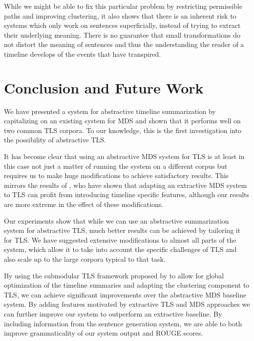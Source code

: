 \documentclass[a4paper,BCOR=10mm]{report}
\numberwithin{lemma}{chapter}
\numberwithin{definition}{chapter}
\begin{document}
While we might be able to fix this particular problem by restricting permissible paths and improving clustering, it also shows that there is an inherent risk to systems which only work on sentences superficially, instead of trying to extract their underlying meaning.
There is no guarantee that small transformations do not distort the meaning of sentences and thus the understanding the reader of a timeline develops of the events that have transpired.



\chapter{Conclusion and Future Work}  \label{sec:conclusion}


We have presented a system for abstractive timeline summarization by capitalizing on an existing system for MDS and shown that it performs well on two common TLS corpora. To our knowledge, this is the first investigation into the possibility of abstractive TLS.

It has become clear that using an abstractive MDS system for TLS is at least in this case not just a matter of running the system on a different corpus but requires us to make huge modifications to achieve satisfactory results. This mirrors the results of \citet{markert}, who have shown that adapting an extractive MDS system to TLS can profit from introducing timeline specific features, although our results are more extreme in the effect of these modifications.

Our experiments show that while we can use an abstractive summarization system for abstractive TLS, much better results can be achieved by tailoring it for TLS.
We have suggested extensive modifications to almost all parts of the system, which allow it to take into account the specific challenges of TLS and also scale up to the large corpora typical to that task.

By using the submodular TLS framework proposed by \citet{markert} to allow for global optimization of the timeline summaries and adapting the clustering component to TLS, we can achieve significant improvements over the abstractive MDS baseline system.
By adding features motivated by extractive TLS and MDS approaches we can further improve our system to outperform an extractive baseline.
By including information from the sentence generation system, we are able to both improve grammaticality of our system output and ROUGE scores.
\end{document}
